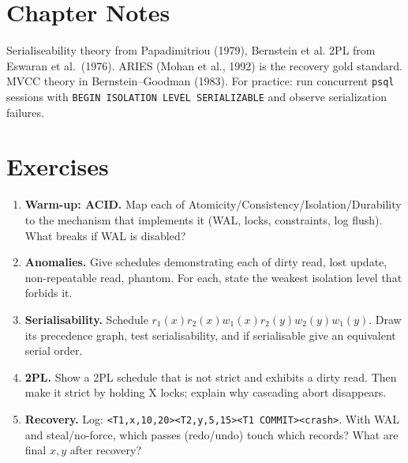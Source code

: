 \section{Chapter Notes}

Serialiseability theory from Papadimitriou (1979), Bernstein et al. 2PL from Eswaran et al.\ (1976). ARIES (Mohan et al., 1992) is the recovery gold standard. MVCC theory in Bernstein--Goodman (1983). For practice: run concurrent \texttt{psql} sessions with \texttt{BEGIN ISOLATION LEVEL SERIALIZABLE} and observe serialization failures.

\section{Exercises}
\label{sec:ch07-ex}
\begin{enumerate}[label=E7.\arabic*, leftmargin=*, itemsep=0.75em]
    \item \textbf{Warm-up: ACID.} Map each of Atomicity/Consistency/Isolation/Durability to the mechanism that implements it (WAL, locks, constraints, log flush). What breaks if WAL is disabled?
    \item \textbf{Anomalies.} Give schedules demonstrating each of dirty read, lost update, non-repeatable read, phantom. For each, state the weakest isolation level that forbids it.
    \item \textbf{Serialisability.} Schedule $r_1(x)r_2(x)w_1(x)r_2(y)w_2(y)w_1(y)$. Draw its precedence graph, test serialisability, and if serialisable give an equivalent serial order.
    \item \textbf{2PL.} Show a 2PL schedule that is not strict and exhibits a dirty read. Then make it strict by holding X locks; explain why cascading abort disappears.
    \item \textbf{Recovery.} Log: \texttt{<T1,x,10,20><T2,y,5,15><T1 COMMIT><crash>}. With WAL and steal/no-force, which passes (redo/undo) touch which records? What are final $x,y$ after recovery?
\end{enumerate}
\relax %
\relax %
